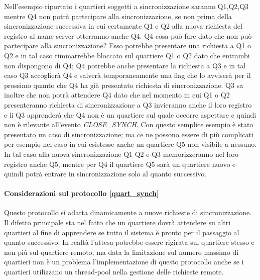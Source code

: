 Nell'esempio riportato i quartieri soggetti a sincronizzazione saranno Q1,Q2,Q3 mentre Q4 non potrà partecipare alla sincronizzazione, se non prima della sincronizzazione successiva in cui certamente Q1 e Q2 alla nuova richiesta del registro al name server otterranno anche Q4. Q4 cosa può fare dato che non può partecipare alla sincronizzazione? Esso potrebbe presentare una richiesta a Q1 o Q2 e in tal caso rimmarrebbe bloccato sul quartiere Q1 o Q2 dato che entrambi non dispongono di Q4; Q4 potrebbe anche presentare la richiesta a Q3 e in tal caso Q3 accoglierà Q4 e salverà temporaneamente una flag che lo avviserà per il prossimo quanto che Q4 ha già presentato richiesta di sincronizzazione. Q3 sa inoltre che non potrà attendere Q4 dato che nel momento in cui Q1 o Q2 presenteranno richiesta di sincronizzazione a Q3 invieranno anche il loro registro e li Q3 apprenderà che Q4 non è un quartiere sul quale occorre aspettare e quindi non è rilevante all'evento \textit{CLOSE\_SYNCH}. Con questo semplice esempio è stato presentato un caso di sincronizzazione; ma ce ne possono essere di più complicati per esempio nel caso in cui esistesse anche un quartiere Q5 non visibile a nessuno. In tal caso alla nuova sincronizzazione Q1 Q2 e Q3 memorizzeranno nel loro registro anche Q5, mentre per Q4 il quartiere Q5 sarà un quartiere nuovo e quindi potrà entrare in sincronizzazione solo al quanto successivo.

\paragraph{Considerazioni sul protocollo \ref{quart_synch}}
Questo protocollo si adatta dinamicamente a nuove richieste di sincronizzazione. Il difetto principale sta nel fatto che un quartiere dovrà attendere su altri quartieri al fine di apprendere se tutto il sistema è pronto per il passaggio al quanto successivo. In realtà l'attesa potrebbe essere rigirata sul quartiere stesso e non più sul quartiere remoto, ma data la limitazione sul numero massimo di quartieri non è un problema l'implementazione di questo protocollo anche se i quartieri utilizzano un thread-pool nella gestione delle richieste remote.